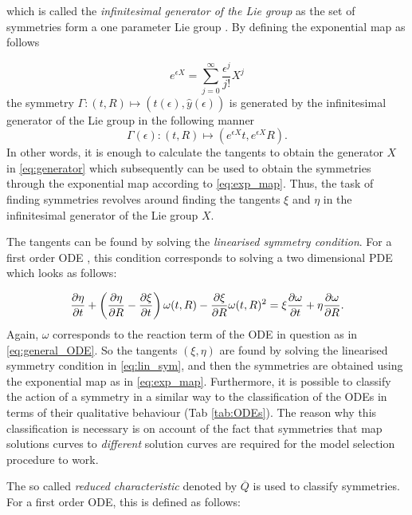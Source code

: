   
which is called the \textit{infinitesimal generator of the Lie group} as the set of symmetries form a one parameter Lie group \cite{hydon2000symmetry}. By defining the exponential map as follows

$$e^{\epsilon X}=\sum_{j=0}^{\infty}\frac{\epsilon^j}{j!}X^j$$
the symmetry $\Gamma:(t,R)\mapsto(\hat{t}(\epsilon),\hat{y}(\epsilon))$ is generated by the infinitesimal generator of the Lie group in the following manner
\begin{equation}
  \Gamma(\epsilon):(t,R)\mapsto\left(e^{\epsilon X}t,e^{\epsilon X}R\right).
  \label{eq:exp_map}
\end{equation}
In other words, it is enough to calculate the tangents to obtain the generator $X$ in \eqref{eq:generator} which subsequently can be used to obtain the symmetries through the exponential map according to \eqref{eq:exp_map}. Thus, the task of finding symmetries revolves around finding the tangents $\xi$ and $\eta$ in the infinitesimal generator of the Lie group $X$.

The tangents can be found by solving the \textit{linearised symmetry condition}. For a first order ODE \cite{hydon2000symmetry}, this condition corresponds to solving a two dimensional PDE which looks as follows:

\begin{equation}
  \pdv{\eta}{t}+\left(\pdv{\eta}{R}-\pdv{\xi}{t}\right)\omega(t,R)-\pdv{\xi}{R}\omega(t,R)^2=\xi\pdv{\omega}{t}+\eta\pdv{\omega}{R}.
  \label{eq:lin_sym}
\end{equation}
Again, $\omega$ corresponds to the reaction term of the ODE in question as in \eqref{eq:general_ODE}. So the tangents $(\xi,\eta)$ are found by solving the linearised symmetry condition in \eqref{eq:lin_sym}, and then the symmetries are obtained using the exponential map as in \eqref{eq:exp_map}. Furthermore, it is possible to classify the action of a symmetry in a similar way to the classification of the ODEs in terms of their qualitative behaviour (Tab \ref{tab:ODEs}). The reason why this classification is necessary is on account of the fact that symmetries that map solutions curves to \textit{different} solution curves are required for the model selection procedure to work.

The so called \textit{reduced characteristic} denoted by $\overline{Q}$ is used to classify symmetries. For a first order ODE, this is defined as follows: \cite{hydon2000symmetry}

